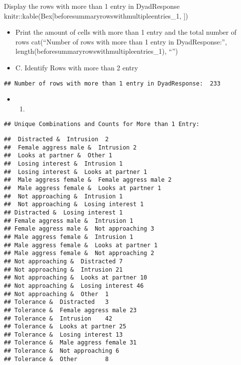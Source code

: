 \documentclass[
]{article}
\providecommand{\tightlist}{%
  \setlength{\itemsep}{0pt}\setlength{\parskip}{0pt}}
\begin{document}
Display the rows with more than 1 entry in DyadResponse
knitr::kable(Bex{[}beforesummaryrowswithmultipleentries\_1, {]})

\begin{itemize}
\item
  Print the amount of cells with more than 1 entry and the total number
  of rows cat(``Number of rows with more than 1 entry in
  DyadResponse:'', length(beforesummaryrowswithmultipleentries\_1),
  ``\n'')
\item
  C. Identify Rows with more than 2 entry
\end{itemize}

\begin{verbatim}
## Number of rows with more than 1 entry in DyadResponse:  233
\end{verbatim}

\begin{itemize}
\item
  \begin{enumerate}
  \def\labelenumi{\Alph{enumi}.}
  \setcounter{enumi}{3}
  \tightlist
  \item
  \end{enumerate}
\end{itemize}

\begin{verbatim}
## Unique Combinations and Counts for More than 1 Entry:
\end{verbatim}

\begin{verbatim}
##  Distracted &  Intrusion  2
##  Female aggress male &  Intrusion 2
##  Looks at partner &  Other 1
##  Losing interest &  Intrusion 1
##  Losing interest &  Looks at partner 1
##  Male aggress female &  Female aggress male 2
##  Male aggress female &  Looks at partner 1
##  Not approaching &  Intrusion 1
##  Not approaching &  Losing interest 1
## Distracted &  Losing interest 1
## Female aggress male &  Intrusion 1
## Female aggress male &  Not approaching 3
## Male aggress female &  Intrusion 1
## Male aggress female &  Looks at partner 1
## Male aggress female &  Not approaching 2
## Not approaching &  Distracted 7
## Not approaching &  Intrusion 21
## Not approaching &  Looks at partner 10
## Not approaching &  Losing interest 46
## Not approaching &  Other  1
## Tolerance &  Distracted   3
## Tolerance &  Female aggress male 23
## Tolerance &  Intrusion    42
## Tolerance &  Looks at partner 25
## Tolerance &  Losing interest 13
## Tolerance &  Male aggress female 31
## Tolerance &  Not approaching 6
## Tolerance &  Other        8
\end{verbatim}
\end{document}
